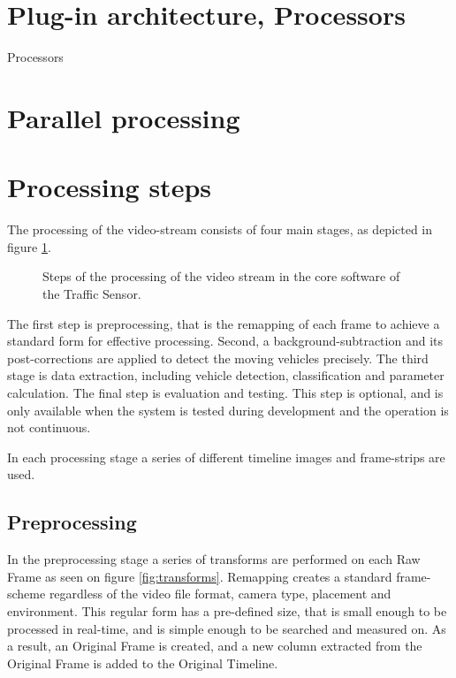 \section{Plug-in architecture, Processors}
Processors

\section{Parallel processing}
\section{Processing steps}
The processing of the video-stream consists of four main stages, as depicted in figure \ref{fig:processing_steps}.

\begin{figure}[bh]
	\centering
	\scalebox{0.7}{	\LARGE}
	\caption{Steps of the processing of the video stream in the core software of the Traffic Sensor.\label{fig:processing_steps}}
\end{figure}

The first step is preprocessing, that is the remapping of each frame to achieve a standard form for effective processing.
Second, a background-subtraction and its post-corrections are applied to detect the moving vehicles precisely.
The third stage is data extraction, including vehicle detection, classification and parameter calculation.
The final step is evaluation and testing. 
This step is optional, and is only available when the system is tested during development and the operation is not continuous.

In each processing stage a series of different timeline images and frame-strips are used.
\subsection{Preprocessing}
In the preprocessing stage a series of transforms are performed on each Raw Frame as seen on figure \ref{fig:transforms}.
Remapping creates a standard frame-scheme regardless of the video file format, camera type, placement and environment.
This regular form has a pre-defined size, that is small enough to be processed in real-time, and is simple enough to be searched and measured on.
As a result, an Original Frame is created, and a new column extracted from the Original Frame is added to the Original Timeline.

